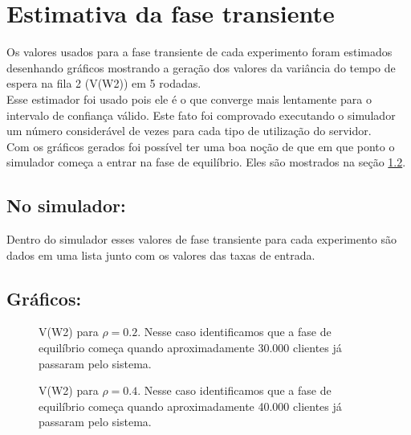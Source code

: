 \chapter{Estimativa da fase transiente}
\label{chap:estimativa}

Os valores usados para a fase transiente de cada experimento foram estimados desenhando gráficos mostrando a geração dos valores da variância do tempo de espera na fila 2 (V(W2)) em 5 rodadas.\\

Esse estimador foi usado pois ele é o que converge mais lentamente para o intervalo de confiança válido. Este fato foi comprovado executando o simulador um número considerável de vezes para cada tipo de utilização do servidor.\\

Com os gráficos gerados foi possível ter uma boa noção de que em que ponto o simulador começa a entrar na fase de equilíbrio. Eles são mostrados na seção \ref{sec:graficos}.\\

\section{No simulador:}

Dentro do simulador esses valores de fase transiente para cada experimento são dados em uma lista junto com os valores das taxas de entrada.

\section{Gráficos:}
\label{sec:graficos}

\begin{figure}[htb!]
   \caption{V(W2) para $\rho=0.2$. Nesse caso identificamos que a fase de equilíbrio começa quando aproximadamente 30.000 clientes já passaram pelo sistema.}
\end{figure}

\begin{figure}[htb!]
   \caption{V(W2) para $\rho=0.4$. Nesse caso identificamos que a fase de equilíbrio começa quando aproximadamente 40.000 clientes já passaram pelo sistema.}
\end{figure}

